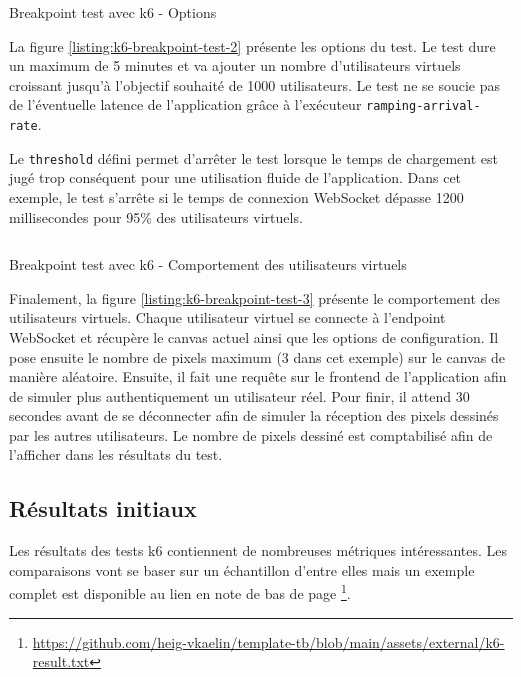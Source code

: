 \begin{listing}[H]
  \inputminted{ts}{assets/figures/breakpoint-test-2.ts}
  \caption{Breakpoint test avec k6 - Options}
  \label{listing:k6-breakpoint-test-2}
\end{listing}

La figure \ref{listing:k6-breakpoint-test-2} présente les options du test. Le test dure un maximum de 5 minutes et va ajouter un nombre d'utilisateurs virtuels croissant jusqu'à l'objectif souhaité de 1000 utilisateurs. Le test ne se soucie pas de l'éventuelle latence de l'application grâce à l'exécuteur \texttt{ramping-arrival-rate}.

Le \texttt{threshold} défini permet d'arrêter le test lorsque le temps de chargement est jugé trop conséquent pour une utilisation fluide de l'application. Dans cet exemple, le test s'arrête si le temps de connexion WebSocket dépasse 1200 millisecondes pour 95\% des utilisateurs virtuels.

\begin{listing}[H]
  \inputminted{ts}{assets/figures/breakpoint-test-3.ts}
  \caption{Breakpoint test avec k6 - Comportement des utilisateurs virtuels}
  \label{listing:k6-breakpoint-test-3}
\end{listing}

Finalement, la figure \ref{listing:k6-breakpoint-test-3} présente le comportement des utilisateurs virtuels. Chaque utilisateur virtuel se connecte à l'endpoint WebSocket et récupère le canvas actuel ainsi que les options de configuration. Il pose ensuite le nombre de pixels maximum (3 dans cet exemple) sur le canvas de manière aléatoire. Ensuite, il fait une requête sur le frontend de l'application afin de simuler plus authentiquement un utilisateur réel. Pour finir, il attend 30 secondes avant de se déconnecter afin de simuler la réception des pixels dessinés par les autres utilisateurs. Le nombre de pixels dessiné est comptabilisé afin de l'afficher dans les résultats du test.

\subsection{Résultats initiaux}

Les résultats des tests k6 contiennent de nombreuses métriques intéressantes. Les comparaisons vont se baser sur un échantillon d'entre elles mais un exemple complet est disponible au lien en note de bas de page \footnote{\url{https://github.com/heig-vkaelin/template-tb/blob/main/assets/external/k6-result.txt}}.

